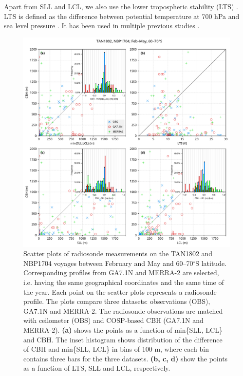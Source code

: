 Apart from SLL and LCL, we also use the lower tropospheric stability (LTS)
\citep{klein1993}. LTS is defined as the difference between potential
temperature at 700 hPa and sea level pressure \citep{klein1993}. It has been
used in multiple previous studies
\citep{williams2006,franklin2013,williams2013,naud2014}. 

\begin{figure}[p]
\centering
\includegraphics[width=\textwidth]{chapter2/fig/rs_scatter_rev1.pdf}
\caption[Scatter plots of radiosonde measurements on the TAN1802 and NBP1704 voyages]{
Scatter plots of radiosonde measurements on the TAN1802 and NBP1704 voyages
between February and May and 60--70$^\circ$S latitude. Corresponding profiles
from GA7.1N and MERRA-2 are selected, i.e. having the same geographical
coordinates and the same time of the year. Each point on the scatter plots
represents a radiosonde profile. The plots compare three datasets: observations
(OBS), GA7.1N and MERRA-2. The radiosonde observations are matched with
ceilometer (OBS) and COSP-based CBH (GA7.1N and MERRA-2). \textbf{(a)} shows the
points as a function of min\{SLL, LCL\} and CBH. The inset histogram shows
distribution of the difference of CBH and min\{SLL, LCL\} in bins of 100
\unit{m}, where each bin contains three bars for the three datasets.
\textbf{(b, c, d)} show the points as a function of LTS, SLL and LCL,
respectively.
}
\label{fig:2:rs-scatter}
\end{figure}

